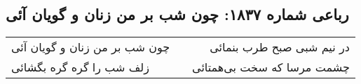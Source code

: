 \begin{center}
\section*{رباعی شماره ۱۸۳۷: چون شب بر من زنان و گویان آئی}
\label{sec:1837}
\begin{longtable}{l p{0.5cm} r}
چون شب بر من زنان و گویان آئی
&&
در نیم شبی صبح طرب بنمائی
\\
زلف شب را گره گره بگشائی
&&
چشمت مرسا که سخت بی‌همتائی
\\
\end{longtable}
\end{center}
